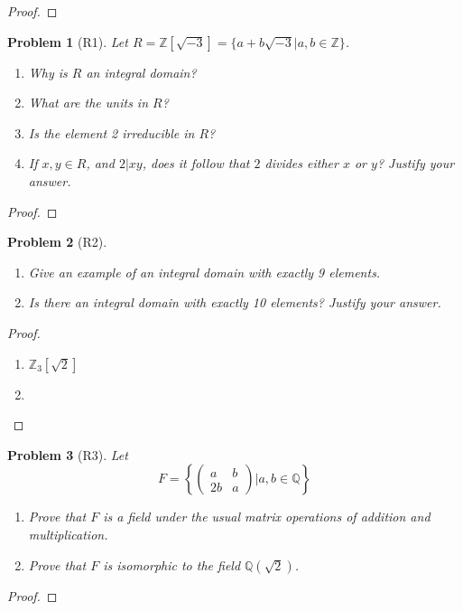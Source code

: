 \documentclass[10pt]{article}
\newcommand{\sk}{\vskip 10mm}
\newcommand{\bb}[1]{\mathbb{#1}}
\theoremstyle{plain}
\newtheorem{problem}{Problem}
\theoremstyle{remark}
\begin{document}
\begin{proof}
  
\end{proof}

\sk

\begin{problem}[R1]
  Let $R=\bb{Z}[\sqrt{-3}]=\{a+b\sqrt{-3}|a,b\in\bb{Z}\}$.
  \begin{enumerate}
  \item Why is $R$ an integral domain?
  \item What are the units in $R$?
  \item Is the element 2 irreducible in $R$?
  \item If $x,y\in R$, and $2|xy$, does it follow that $2$ divides
    either $x$ or $y$? Justify your answer.
  \end{enumerate}
\end{problem}

\begin{proof}
  
\end{proof}

\sk

\begin{problem}[R2]
  \begin{enumerate}
  \item Give an example of an integral domain with exactly 9 elements.
  \item Is there an integral domain with exactly 10 elements? Justify
    your answer.
  \end{enumerate}
\end{problem}

\begin{proof}
  \begin{enumerate}
  \item $\bb{Z}_3[\sqrt{2}]$
  \item
  \end{enumerate}
\end{proof}

\sk

\begin{problem}[R3]
  Let
  \[
    F =
    \left\{\left(
        \begin{array}{cc}
          a&b\\
          2b&a
        \end{array}
      \right)| a,b\in \bb{Q}\right\}
  \]
  \begin{enumerate}
  \item Prove that $F$ is a field under the usual matrix operations of addition
    and multiplication.
  \item Prove that $F$ is isomorphic to the field $\bb{Q}(\sqrt{2})$.
  \end{enumerate}
\end{problem}

\begin{proof}
  
\end{proof}

\sk

\end{document}
